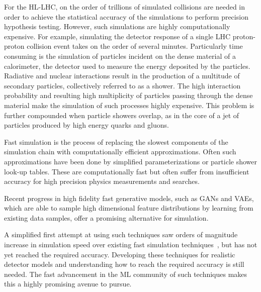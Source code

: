 For the HL-LHC, on the order of trillions of simulated collisions are needed in order to achieve the statistical accuracy of the simulations to perform precision hypothesis testing. However, such simulations are highly computationally expensive. For example, simulating the detector response of  a single LHC proton-proton collision event takes on the order of several minutes. Particularly time consuming is the simulation of particles incident on the dense material of a calorimeter, the detector used to measure the energy deposited by the particles. Radiative and nuclear interactions result in the production of a multitude of secondary particles, collectively referred to as a shower.
The high interaction probability and resulting high multiplicity of particles passing through the dense material make the simulation of such processes highly expensive. This problem is further compounded when particle showers overlap, as in the core of a jet of particles produced by high energy quarks and gluons.\medskip


Fast simulation is the process of replacing the slowest components of the simulation chain with computationally efficient approximations. Often such approximations have been done by simplified parameterizations or particle shower look-up tables. These are computationally fast but often suffer from insufficient accuracy for high precision physics measurements and searches.\medskip

Recent progress in high fidelity fast generative models, such as GANs and VAEs, which are able to sample high dimensional feature distributions by learning from existing data samples, offer a promising alternative for simulation.


A simplified first attempt at using such techniques saw orders of magnitude increase in simulation speed over existing fast simulation techniques~\cite{Paganini:2017hrr}, but has not yet reached the required accuracy. Developing these techniques for realistic detector models and understanding how to reach the required accuracy is still needed. The fast advancement in the ML community of such techniques makes this a highly promising avenue to pursue.\medskip

